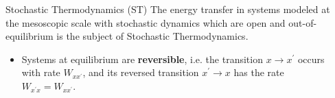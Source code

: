\documentclass[final]{beamer}
\newlength{\sepwidth}
\newlength{\colwidth}
\newcommand{\separatorcolumn}{\begin{column}{\sepwidth}\end{column}}
\begin{document}
\begin{frame}[t]
\begin{columns}[t]
\separatorcolumn

\begin{column}{\colwidth}

\begin{block}{Stochastic Thermodynamics (ST)}
\vskip10pt
\justifying
The energy transfer in systems modeled at the mesoscopic scale with stochastic dynamics which are open and out-of-equilibrium is the subject of Stochastic Thermodynamics\cite{peliti2021stochastic,Falasco:2023aa}. 
%
\begin{itemize}
\justifying
\item Systems at equilibrium are {\bf reversible}, i.e. the transition $x \rightarrow x^\prime$ occurs with rate $W_{xx^\prime}$, and its reversed transition $x^\prime \rightarrow x$ has the rate $W_{x^\prime x}=W_{xx^\prime}$.


\end{itemize}
\end{block}
\end{column}
\end{columns}
\end{frame}
\end{document}
